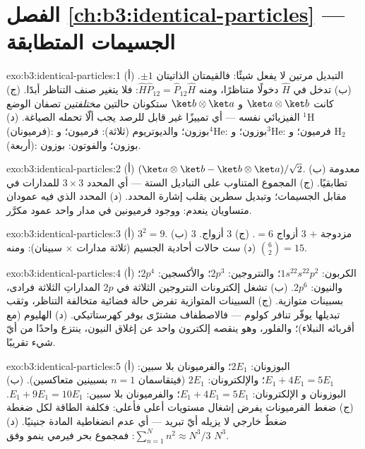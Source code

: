 \section*{الفصل \ref{ch:b3:identical-particles} --- الجسيمات المتطابقة}

\begin{solution}{exo:b3:identical-particles:1}
(أ) التبديل مرتين لا يفعل شيئًا: فالقيمتان الذاتيتان $\pm1$. (ب)
تدخل  في $\hat H$ دخولًا متناظرًا، ومنه $\hat H\hat
P_{12} = \hat P_{12}\hat H$: فلا يتغير صنف التناظر أبدًا. (ج)
كانت $\ket a\otimes\ket b$ و $\ket b\otimes\ket a$ ستكونان حالتين
\emph{مختلفتين} تصفان الوضع الفيزيائي نفسه ---
أي تمييزًا غير قابل للرصد يجب ألّا تحمله الصياغة. (د)
$^1$H (فرميونان): بوزون؛ والديوتريوم (ثلاثة): فرميون؛ و$^4$He: بوزون؛
و$^3$He: فرميون؛ و H$_2$ (أربعة): بوزون؛ والفوتون: بوزون.
\end{solution}

\begin{solution}{exo:b3:identical-particles:2}
(أ) $(\ket a\otimes\ket b - \ket b\otimes\ket a)/\sqrt2$. (ب)
معدومة تطابقيًا. (ج) المجموع المتناوب على التباديل
الستة --- أي المحدد $3\times3$ للمدارات في مقابل
الجسيمات؛ وتبديل سطرين يقلب إشارة المحدد. (د)
المحدد الذي فيه عمودان متساويان ينعدم: ووجود فرميونين في مدار
واحد عمود مكرَّر.
\end{solution}

\begin{solution}{exo:b3:identical-particles:3}
(أ) $3^2 = 9$. (ب) $3$ مزدوجة $+$ $3$ أزواج $= 6$. (ج) $3$ أزواج.
(د) ست حالات أحادية الجسيم (ثلاثة مدارات $\times$ سبينان):
ومنه $\binom62 = 15$.
\end{solution}

\begin{solution}{exo:b3:identical-particles:4}
(أ) الكربون: $1s^22s^22p^2$؛ والنتروجين: $2p^3$؛ والأكسجين: $2p^4$؛ والنيون: $2p^6$. (ب)
تشغل إلكترونات النتروجين الثلاثة في $2p$ المداراتِ الثلاثة فرادى،
بسبينات متوازية. (ج) السبينات المتوازية تفرض حالة فضائية
متخالفة التناظر، وثقب تبديلها يوفّر تنافر كولوم --- فالاصطفاف
مشترًى بوفر كهرستاتيكي. (د) الهليوم (مع أقربائه
النبلاء)؛ والفلور، وهو ينقصه إلكترون واحد عن إغلاق النيون، ينتزع
واحدًا من أيّ شيء تقريبًا.
\end{solution}

\begin{solution}{exo:b3:identical-particles:5}
(أ) البوزونان: $2E_1$؛ والفرميونان بلا سبين: $E_1 + 4E_1 = 5E_1$؛
والإلكترونان: $2E_1$ (فيتقاسمان $n = 1$ بسبينين متعاكسين). (ب) البوزونان و
الإلكترونان: $E_1 + 4E_1 = 5E_1$؛ والفرميونان بلا سبين: $E_1 + 9E_1 =
10E_1$. (ج) ضغط الفرميونات يفرض إشغال مستويات أعلى
فأعلى: فكلفة الطاقة لكل ضغطة ضغطٌ خارجي لا يزيله أيّ
تبريد --- أي عدم انضغاطية المادة جنينيًا. (د)
$\sum_{n=1}^N n^2 \approx N^3/3$: فمجموع بحر فيرمي ينمو وفق
$N^3$.
\end{solution}

